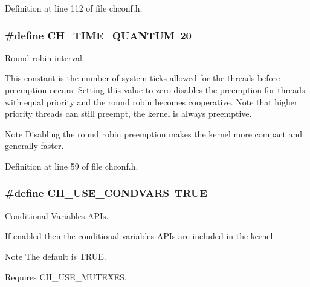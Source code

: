 Definition at line 112 of file chconf.\+h.

\hypertarget{group__config_ga3c6800242611cf244a38c4a870e8515a}{}
\subsubsection[{C\+H\+\_\+\+T\+I\+M\+E\+\_\+\+Q\+U\+A\+N\+T\+U\+M}]{\setlength{\rightskip}{0pt plus 5cm}\#define C\+H\+\_\+\+T\+I\+M\+E\+\_\+\+Q\+U\+A\+N\+T\+U\+M~20}\label{group__config_ga3c6800242611cf244a38c4a870e8515a}


Round robin interval. 

This constant is the number of system ticks allowed for the threads before preemption occurs. Setting this value to zero disables the preemption for threads with equal priority and the round robin becomes cooperative. Note that higher priority threads can still preempt, the kernel is always preemptive.

\begin{DoxyNote}{Note}
Disabling the round robin preemption makes the kernel more compact and generally faster. 
\end{DoxyNote}


Definition at line 59 of file chconf.\+h.

\hypertarget{group__config_ga24fd7fe539fd6094b5db3215e1721c9c}{}
\subsubsection[{C\+H\+\_\+\+U\+S\+E\+\_\+\+C\+O\+N\+D\+V\+A\+R\+S}]{\setlength{\rightskip}{0pt plus 5cm}\#define C\+H\+\_\+\+U\+S\+E\+\_\+\+C\+O\+N\+D\+V\+A\+R\+S~T\+R\+U\+E}\label{group__config_ga24fd7fe539fd6094b5db3215e1721c9c}


Conditional Variables A\+P\+Is. 

If enabled then the conditional variables A\+P\+Is are included in the kernel.

\begin{DoxyNote}{Note}
The default is {\ttfamily T\+R\+U\+E}. 

Requires {\ttfamily C\+H\+\_\+\+U\+S\+E\+\_\+\+M\+U\+T\+E\+X\+E\+S}. 
\end{DoxyNote}


